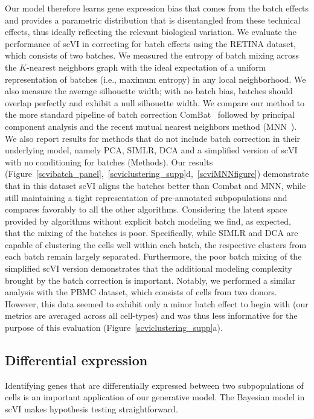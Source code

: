 Our model therefore learns gene expression bias that comes from the batch effects and provides a parametric distribution that is disentangled from these technical effects, thus ideally reflecting the relevant biological variation. We evaluate the performance of scVI in correcting for batch effects using the RETINA dataset, which consists of two batches. We measured the entropy of batch mixing across the $K$-nearest neighbors graph with the ideal expectation of a uniform representation of batches (i.e., maximum entropy) in any local neighborhood. We also measure the average silhouette width; with no batch bias, batches should overlap perfectly and exhibit a null silhouette width. We compare our method to the more standard pipeline of batch correction ComBat~\cite{Johnson2007} followed by principal component analysis and the recent mutual nearest neighbors method (MNN~\cite{MNNpaper}). We also report results for methods that do not include batch correction in their underlying model, namely PCA, SIMLR, DCA and a simplified version of scVI with no conditioning for batches (Methods). Our results (Figure~\ref{scvibatch_panel},~\ref{scviclustering_supp}d,~\ref{scviMNNfigure}) demonstrate that in this dataset scVI aligns the batches better than Combat and MNN, while still maintaining a tight representation of pre-annotated subpopulations and compares favorably to all the other algorithms. Considering the latent space provided by algorithms without explicit batch modeling we find, as expected, that the mixing of the batches is poor. Specifically, while SIMLR and DCA are capable of clustering the cells well within each batch, the respective clusters from each batch remain largely separated. Furthermore, the poor batch mixing of the simplified scVI version demonstrates that the additional modeling complexity brought by the batch correction is important. Notably, we performed a similar analysis with the PBMC dataset, which consists of cells from two donors. However, this data seemed to exhibit only a minor batch effect to begin with (our metrics are averaged across all cell-types) and was thus less informative for the purpose of this evaluation  (Figure~\ref{scviclustering_supp}a).


\subsection{Differential expression}
\label{scvide_results}
Identifying genes that are differentially expressed between two subpopulations of cells is an important application of our generative model. The Bayesian model in scVI makes hypothesis testing straightforward. 

